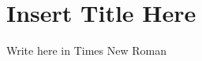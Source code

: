 \documentclass[a4paper,12pt]{article}
\begin{document}
\section*{ Insert Title Here  }
Write here in Times New Roman
\end{document}
